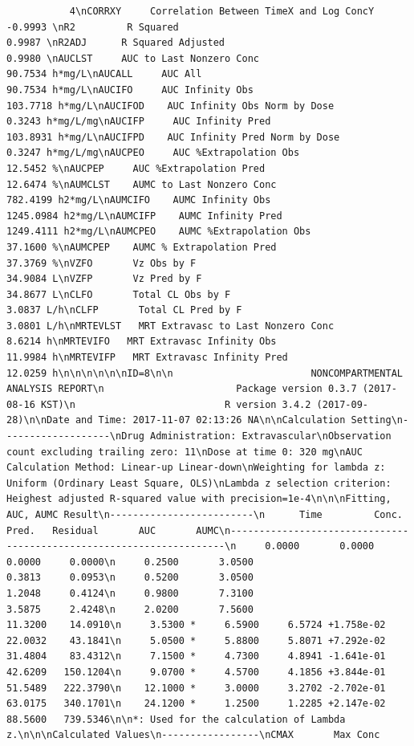 \documentclass[12pt,]{krantz}
\theoremstyle{definition}
\theoremstyle{definition}
\theoremstyle{definition}
\theoremstyle{remark}
\begin{document}
\begin{verbatim}
           4\nCORRXY     Correlation Between TimeX and Log ConcY        -0.9993 \nR2         R Squared                                       0.9987 \nR2ADJ      R Squared Adjusted                              0.9980 \nAUCLST     AUC to Last Nonzero Conc                       90.7534 h*mg/L\nAUCALL     AUC All                                        90.7534 h*mg/L\nAUCIFO     AUC Infinity Obs                              103.7718 h*mg/L\nAUCIFOD    AUC Infinity Obs Norm by Dose                   0.3243 h*mg/L/mg\nAUCIFP     AUC Infinity Pred                             103.8931 h*mg/L\nAUCIFPD    AUC Infinity Pred Norm by Dose                  0.3247 h*mg/L/mg\nAUCPEO     AUC %Extrapolation Obs                         12.5452 %\nAUCPEP     AUC %Extrapolation Pred                        12.6474 %\nAUMCLST    AUMC to Last Nonzero Conc                     782.4199 h2*mg/L\nAUMCIFO    AUMC Infinity Obs                            1245.0984 h2*mg/L\nAUMCIFP    AUMC Infinity Pred                           1249.4111 h2*mg/L\nAUMCPEO    AUMC %Extrapolation Obs                        37.1600 %\nAUMCPEP    AUMC % Extrapolation Pred                      37.3769 %\nVZFO       Vz Obs by F                                    34.9084 L\nVZFP       Vz Pred by F                                   34.8677 L\nCLFO       Total CL Obs by F                               3.0837 L/h\nCLFP       Total CL Pred by F                              3.0801 L/h\nMRTEVLST   MRT Extravasc to Last Nonzero Conc              8.6214 h\nMRTEVIFO   MRT Extravasc Infinity Obs                     11.9984 h\nMRTEVIFP   MRT Extravasc Infinity Pred                    12.0259 h\n\n\n\n\n\nID=8\n\n                        NONCOMPARTMENTAL ANALYSIS REPORT\n                       Package version 0.3.7 (2017-08-16 KST)\n                          R version 3.4.2 (2017-09-28)\n\nDate and Time: 2017-11-07 02:13:26 NA\n\nCalculation Setting\n-------------------\nDrug Administration: Extravascular\nObservation count excluding trailing zero: 11\nDose at time 0: 320 mg\nAUC Calculation Method: Linear-up Linear-down\nWeighting for lambda z: Uniform (Ordinary Least Square, OLS)\nLambda z selection criterion: Heighest adjusted R-squared value with precision=1e-4\n\n\nFitting, AUC, AUMC Result\n-------------------------\n      Time         Conc.      Pred.   Residual       AUC       AUMC\n---------------------------------------------------------------------\n     0.0000       0.0000                           0.0000     0.0000\n     0.2500       3.0500                           0.3813     0.0953\n     0.5200       3.0500                           1.2048     0.4124\n     0.9800       7.3100                           3.5875     2.4248\n     2.0200       7.5600                          11.3200    14.0910\n     3.5300 *     6.5900     6.5724 +1.758e-02    22.0032    43.1841\n     5.0500 *     5.8800     5.8071 +7.292e-02    31.4804    83.4312\n     7.1500 *     4.7300     4.8941 -1.641e-01    42.6209   150.1204\n     9.0700 *     4.5700     4.1856 +3.844e-01    51.5489   222.3790\n    12.1000 *     3.0000     3.2702 -2.702e-01    63.0175   340.1701\n    24.1200 *     1.2500     1.2285 +2.147e-02    88.5600   739.5346\n\n*: Used for the calculation of Lambda z.\n\n\nCalculated Values\n-----------------\nCMAX       Max Conc         
\end{verbatim}
\end{document}
